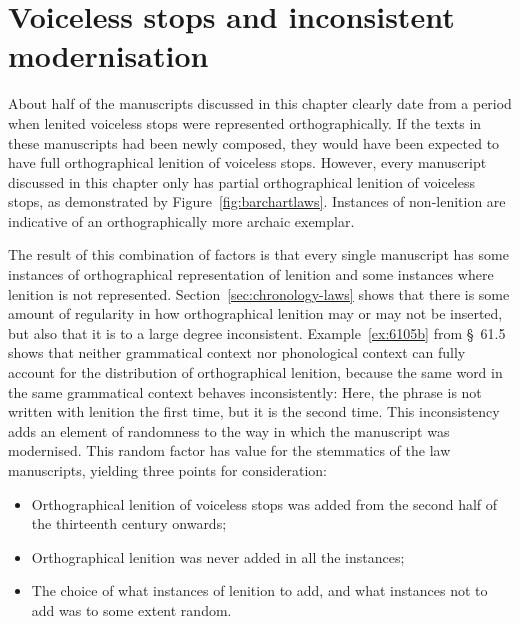 

\section{Voiceless stops and inconsistent modernisation}
\label{sec:voiceless-stops}
About half of the manuscripts discussed in this chapter clearly date from a period when lenited voiceless stops were represented orthographically. If the texts in these manuscripts had been newly composed, they would have been expected to  have full orthographical lenition of voiceless stops. However, every manuscript discussed in this chapter only has partial orthographical lenition of voiceless stops, as demonstrated by Figure~\ref{fig:barchartlaws}. Instances of non-lenition are indicative of an orthographically more archaic exemplar.

The result of this combination of factors is that every single  manuscript has some instances of orthographical representation of lenition and some instances where lenition is not represented. Section~\ref{sec:chronology-laws} shows that there is some amount of regularity in how orthographical lenition may or may not be inserted, but also that it is to a large degree inconsistent. Example~\ref{ex:6105b} from §~61.5 shows that neither grammatical context nor phonological context can fully account for the distribution of orthographical lenition, because the same word in the same grammatical context behaves inconsistently:
Here, the phrase  is not written with lenition the first time, but it is the second time. This inconsistency adds an element of randomness to the way in which the manuscript was modernised. This random factor has value for the stemmatics of the law manuscripts, yielding three  points for consideration:
\begin{itemize}
\item Orthographical lenition of voiceless stops was added from the second half of the thirteenth century onwards;
\item Orthographical lenition was never added in all the instances;
\item The choice of what instances of lenition to add, and what instances not to add was to some extent random.
\end{itemize}

